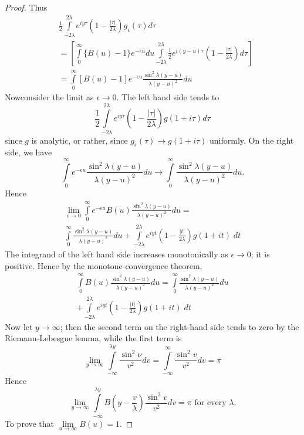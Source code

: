 \begin{proof}
Thus 
\begin{align*}
& \frac{1}{2} \int\limits^{2\lambda}_{-2\lambda} e^{iy \tau} \left(
1-\frac{|\tau|}{2\lambda}\right)  g_\epsilon (\tau) d \tau\\
& = \left[\int\limits^\infty_0 \{B(u)-1\} e^{-\epsilon u} du
  \int\limits^{2\lambda}_{-2\lambda} \frac{1}{2} e^{i(y-u)\tau}
  \left(1-\frac{|\tau|}{2\lambda} \right) d\tau \right]\\
& = \int\limits^\infty_0 [B(u) -1]e^{-\epsilon u} \frac{\sin^2
  \lambda(y-u)}{\lambda(y-u)^2}  du
\end{align*}
Now\pageoriginale consider the limit as $\epsilon \to 0$. The left
hand side tends to 
$$
\frac{1}{2} \int\limits^{2\lambda}_{-2\lambda} e^{iy\tau} \left(1 -
\frac{|\tau|}{2\lambda} \right)  g(1+i\tau) d \tau
$$
since $g$ is analytic, or rather, since $g_\epsilon (\tau) \to
g(1+i\tau)$ uniformly. On the right side, we have
$$
\int\limits^{\infty}_0 e^{-\epsilon u}
\frac{\sin^2\lambda(y-u)}{\lambda(y-u)^2} du \to
\int\limits^{\infty}_0 \frac{\sin^2 \lambda(y-u)}{\lambda(y-u)^2} du. 
$$
Hence
\begin{multline*}
\lim\limits_{\epsilon \to 0} \int\limits^\infty_0 e^{-\epsilon
  u} B(u) \frac{\sin^2 \lambda (y-u)}{\lambda(y-u)^2} du =\\
\int\limits^\infty_0 \frac{\sin^2 \lambda(y-u)}{\lambda(y-u)^2} du +
\int\limits^{2\lambda}_{-2\lambda} e^{iyt}
\left(1-\frac{|t|}{2\lambda} \right) g(1+it) \; dt
\end{multline*}
The integrand of the left hand side increases monotonically as
$\epsilon \to 0$; it is positive. Hence by the monotone-convergence
theorem,
\begin{multline*}
\int\limits^\infty_0 B(u) \frac{\sin^2 \lambda(y-u)}{\lambda(y-u)^2}
du = \int\limits^\infty_0 \frac{\sin^2 \lambda (y-u)}{\lambda(y-u)^2}
du \\
+ \int\limits^{2\lambda}_{-2\lambda} e^{iyt}
\left(1-\frac{|t|}{2\lambda} \right) g (1+it) \; dt
\end{multline*}
Now let $y \to \infty$; then the second term on the right-hand side
tends to zero by the Riemann-Lebesgue lemma, while the first term is
$$
\lim\limits_{y\to\infty} \int\limits^{\lambda y}_{-\infty}
\frac{\sin^2 \nu}{v^2} dv = \int\limits^\infty_{-\infty} \frac{\sin^2
  v}{v^2} dv = \pi 
$$
Hence\pageoriginale
$$ 
\lim\limits_{y \to \infty} \int\limits^{\lambda y}_{-\infty}
B \left(y-\frac{v}{\lambda} \right) \frac{\sin^2v}{v^2} dv = \pi \text{ for every }
\lambda. 
$$
To prove that \quad $\lim\limits_{u \to \infty} B(u) =1$.
\end{proof}

